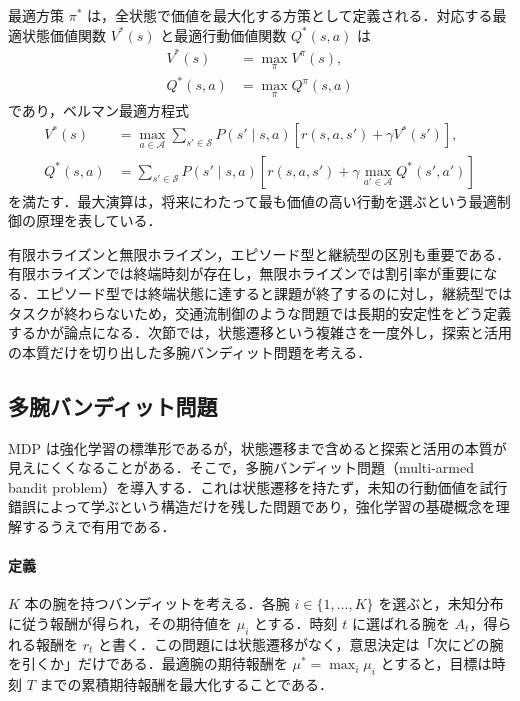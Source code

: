 最適方策 $\pi^\ast$ は，全状態で価値を最大化する方策として定義される．対応する最適状態価値関数 $V^\ast(s)$ と最適行動価値関数 $Q^\ast(s,a)$ は
\begin{align}
V^\ast(s) &= \max_\pi V^\pi(s), \\
Q^\ast(s,a) &= \max_\pi Q^\pi(s,a)
\end{align}
であり，ベルマン最適方程式
\begin{align}
V^\ast(s)
&=
\max_{a \in \mathcal{A}}
\sum_{s' \in \mathcal{S}} P(s' \mid s,a)
\left[
r(s,a,s') + \gamma V^\ast(s')
\right], \\
Q^\ast(s,a)
&=
\sum_{s' \in \mathcal{S}} P(s' \mid s,a)
\left[
r(s,a,s') + \gamma \max_{a' \in \mathcal{A}} Q^\ast(s',a')
\right]
\end{align}
を満たす．最大演算は，将来にわたって最も価値の高い行動を選ぶという最適制御の原理を表している．

有限ホライズンと無限ホライズン，エピソード型と継続型の区別も重要である．有限ホライズンでは終端時刻が存在し，無限ホライズンでは割引率が重要になる．エピソード型では終端状態に達すると課題が終了するのに対し，継続型ではタスクが終わらないため，交通流制御のような問題では長期的安定性をどう定義するかが論点になる．次節では，状態遷移という複雑さを一度外し，探索と活用の本質だけを切り出した多腕バンディット問題を考える．

\subsection{多腕バンディット問題}\label{subsec:bandit}

MDP は強化学習の標準形であるが，状態遷移まで含めると探索と活用の本質が見えにくくなることがある．そこで，多腕バンディット問題（multi-armed bandit problem）を導入する．これは状態遷移を持たず，未知の行動価値を試行錯誤によって学ぶという構造だけを残した問題であり，強化学習の基礎概念を理解するうえで有用である\cite{Auer2002,LattimoreSzepesvari2020}．

\paragraph*{定義}
$K$ 本の腕を持つバンディットを考える．各腕 $i \in \{1,\ldots,K\}$ を選ぶと，未知分布に従う報酬が得られ，その期待値を $\mu_i$ とする．時刻 $t$ に選ばれる腕を $A_t$，得られる報酬を $r_t$ と書く．この問題には状態遷移がなく，意思決定は「次にどの腕を引くか」だけである．最適腕の期待報酬を $\mu^\ast=\max_i \mu_i$ とすると，目標は時刻 $T$ までの累積期待報酬を最大化することである．

